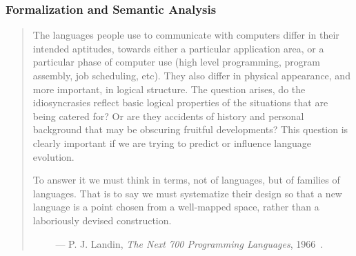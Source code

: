 \documentclass[11pt]{article}
\begin{document}
% 


\subsubsection{Formalization and Semantic Analysis}

\begin{quote}
The languages people use to communicate with computers
differ in their intended aptitudes, towards either a particular
application area, or a particular phase of computer use
(high level programming, program assembly, job scheduling,
etc). They also differ in physical appearance, and more
important, in logical structure. The question arises, do the
idiosyncrasies reflect basic logical properties of the situations
that are being catered for? Or are they accidents of history
and personal background that may be obscuring fruitful
developments? This question is clearly important if we are
trying to predict or influence language evolution.

To answer it we must think in terms, not of languages,
but of families of languages. That is to say we must systematize
their design so that a new language is a point chosen
from a well-mapped space, rather than a laboriously devised
construction.

$\qquad$ --- P. J. Landin, {\em The Next 700 Programming Languages}, 
1966~\cite{landin:700}.
\end{quote}
\end{document}
